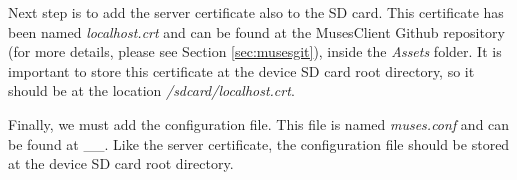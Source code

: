 Next step is to add the server certificate also to the SD card. This certificate has been named \textit{localhost.crt} and can be found at the MusesClient Github repository (for more details, please see Section \ref{sec:musesgit}), inside the \textit{Assets} folder. It is important to store this certificate at the device SD card root directory, so it should be at the location \textit{/sdcard/localhost.crt}.

Finally, we must add the configuration file. This file is named \textit{muses.conf} and can be found at \_\_. Like the server certificate, the configuration file should be stored at the device SD card root directory.





